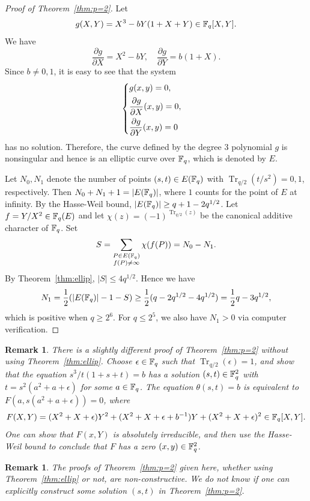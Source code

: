 \documentclass{amsart}
\newtheorem{rmk}[thm]{Remark}
\numberwithin{equation}{section}
\theoremstyle{definition}
\newcommand{\f}{\Bbb F}
\DeclareMathOperator{\trace}{\mathrm{Tr}}
\begin{document}
\begin{proof}[Proof of Theorem~\ref{thm:p=2}]
Let 
\[
g(X,Y)=X^3-bY(1+X+Y)\in\f_q[X,Y].
\]
We have
\[
\frac{\partial g}{\partial X}=X^2-bY,\quad
\frac{\partial g}{\partial Y}=b(1+X).
\] 
Since $b\ne 0,1$, it is easy to see that the system
\[
\begin{cases}
g(x,y)=0,\vspace{0.4em}\cr
\displaystyle\frac{\partial g}{\partial X}(x,y)=0,\vspace{0.4em}\cr
\displaystyle\frac{\partial g}{\partial Y}(x,y)=0
\end{cases}
\]
has no solution. Therefore, the curve defined by the degree 3 polynomial $g$ is nonsingular and hence is an elliptic curve over $\f_q$, which is denoted by $E$.

Let $N_0, N_1$ denote the number of points $(s,t)\in E(\f_q)$ with $\trace_{q/2}(t/s^2)=0,1$, respectively. Then $N_0+N_1+1=|E(\f_q)|$, where $1$ counts for the point of $E$ at infinity. By the Hasse-Weil bound, $|E(\f_q)|\ge q+1-2q^{1/2}$. Let $f=Y/X^2\in\f_q(E)$ and let $\chi(z)=(-1)^{\trace_{q/2}(z)}$ be the canonical additive character of $\f_q$. Set
\[
S=\sum_{\substack{P\in E(\f_q)\cr f(P)\ne\infty}}\chi(f(P))=N_0-N_1.
\]
By Theorem~\ref{thm:ellip}, $|S|\le 4q^{1/2}$. Hence we have
\[
N_1=\frac 12(|E(\f_q)|-1-S)\ge\frac 12(q-2q^{1/2}-4q^{1/2})=\frac 12q-3q^{1/2},
\]
which is positive when $q\ge 2^6$. For $q\le 2^5$, we also have $N_1>0$ via computer verification.
\end{proof}

\begin{rmk}\rm
There is a slightly different proof of Theorem~\ref{thm:p=2} without using Theorem~\ref{thm:ellip}. Choose $\epsilon\in\f_q$ such that $\trace_{q/2}(\epsilon)=1$, and show that the equation $s^3/t(1+s+t)=b$ has a solution $(s,t)\in\f_q^2$ with $t=s^2(a^2+a+\epsilon)$ for some $a\in\f_q$. The equation $\theta(s,t)=b$ is equivalent to 
$F(a,s(a^2+a+\epsilon))=0$,
where
\[
F(X,Y)=(X^2+X+\epsilon)Y^2+(X^2+X+\epsilon+b^{-1})Y+(X^2+X+\epsilon)^2\in\f_q[X,Y].
\]
One can show that $F(x,Y)$ is absolutely irreducible, and then use the Hasse-Weil bound to conclude that $F$ has a zero $(x,y)\in\f_q^2$.
\end{rmk}

\begin{rmk}\rm
The proofs of Theorem~\ref{thm:p=2} given here, whether using Theorem~\ref{thm:ellip} or not, are non-constructive. We do not know if one can explicitly construct some solution $(s,t)$ in Theorem~\ref{thm:p=2}.
\end{rmk}
\end{document}
